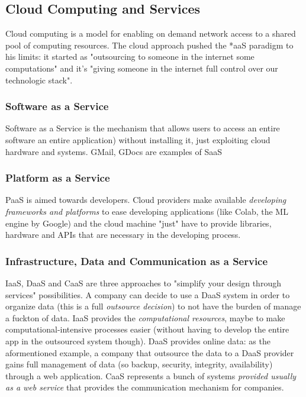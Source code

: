 \documentclass[10pt,a4paper]{article}
\begin{document}
			\subsection{Cloud Computing and Services}
				Cloud computing is a model for enabling on demand network access to a shared pool of computing resources. The cloud approach pushed the *aaS paradigm to his limits: it started as "outsourcing to someone in the internet some computations" and it's "giving someone in the internet full control over our technologic stack".
				
				\subsubsection{Software as a Service}
					Software as a Service is the mechanism that allows users to access an entire software an entire application) without installing it, just exploiting cloud hardware and systems. GMail, GDocs are examples of SaaS
				
				\subsubsection{Platform as a Service}
					PaaS is aimed towards developers. Cloud providers make available \emph{developing frameworks and platforms} to ease developing applications (like Colab, the ML engine by Google) and the cloud machine "just" have to provide libraries, hardware and APIs that are necessary in the developing process.
				
				\subsubsection{Infrastructure, Data and Communication as a Service}
					IaaS, DaaS and CaaS are three approaches to "simplify your design through services" possibilities. A company can decide to use a DaaS system in order to organize data (this is a full \emph{outsource decision}) to not have the burden of manage a fuckton of data. IaaS provides the \emph{computational resources}, maybe to make computational-intensive processes easier (without having to develop the entire app in the outsourced system though). DaaS provides online data: as the aformentioned example, a company that outsource the data to a DaaS provider gains full management of data (so backup, security, integrity, availability) through a web application. CaaS represents a bunch of systems \emph{provided usually as a web service} that provides the communication mechanism for companies. 
				
\end{document}
